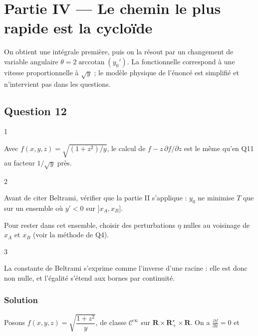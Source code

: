 \documentclass[11pt,a4paper]{article}
\newcommand{\equationajustee}[1]{%
  \sbox{\boiteequation}{$\displaystyle #1$}%
  \ifdim\wd\boiteequation>\linewidth
    \[\resizebox{\linewidth}{!}{\usebox{\boiteequation}}\]%
  \else
    \[#1\]%
  \fi}
\begin{document}
\hypertarget{partie-iv-le-chemin-le-plus-rapide-est-la-cyclouxefde}{%
\section{Partie IV --- Le chemin le plus rapide est la cycloïde}\label{partie-iv-le-chemin-le-plus-rapide-est-la-cyclouxefde}}

On obtient une intégrale première, puis on la résout par un changement de variable angulaire \(\theta=2\operatorname{arccotan}(y_0')\). La fonctionnelle correspond à une vitesse proportionnelle à \(\sqrt y\) ; le modèle physique de l'énoncé est simplifié et n'intervient pas dans les questions.

\hypertarget{question-12}{%
\subsection{Question 12}\label{question-12}}

\begin{indication}{1}

Avec \(f(x,y,z)=\sqrt{(1+z^2)/y}\), le calcul de \(f-z\,\partial f/\partial z\) est le même qu'en Q11 au facteur \(1/\sqrt y\) près.

\end{indication}

\begin{indication}{2}

Avant de citer Beltrami, vérifier que la partie II s'applique : \(y_0\) ne minimise \(T\) que sur un ensemble où \(y'<0\) sur \(]x_A,x_B]\).

Pour rester dans cet ensemble, choisir des perturbations \(\eta\) nulles au voisinage de \(x_A\) et \(x_B\) (voir la méthode de Q4).

\end{indication}

\begin{indication}{3}

La constante de Beltrami s'exprime comme l'inverse d'une racine : elle est donc non nulle, et l'égalité s'étend aux bornes par continuité.

\end{indication}

\hypertarget{solution-11}{%
\subsubsection{Solution}\label{solution-11}}

Posons \(f(x,y,z)=\sqrt{\dfrac{1+z^2}{y}}\), de classe \(\mathcal C^\infty\) sur \(\mathbf R\times\mathbf R_+^\star\times\mathbf R\). On a \(\frac{\partial f}{\partial x}=0\) et
\equationajustee{\frac{\partial f}{\partial z}(x,y,z)=\frac{z}{\sqrt y\,\sqrt{1+z^2}}.}
\end{document}
